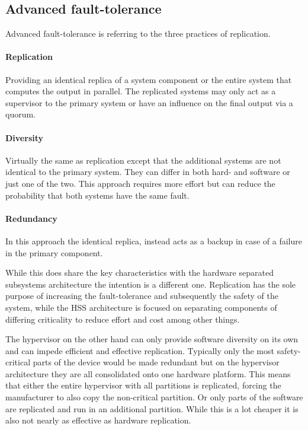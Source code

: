 \subsection{Advanced fault-tolerance} \label{advanced-fault-tolerance}
Advanced fault-tolerance is referring to the three practices of replication.
\paragraph{Replication} Providing an identical replica of a system component or the entire system that computes the output in parallel. The replicated systems may only act as a supervisor to the primary system or have an influence on the final output via a quorum.
\paragraph{Diversity} Virtually the same as replication except that the additional systems are not identical to the primary system. They can differ in both hard- and software or just one of the two. This approach requires more effort but can reduce the probability that both systems have the same fault. 
\paragraph{Redundancy} In this approach the identical replica, instead acts as a backup in case of a failure in the primary component.

While this does share the key characteristics with the hardware separated subsystems architecture the intention is a different one. 
Replication has the sole purpose of increasing the fault-tolerance and subsequently the safety of the system, while the \gls{HSS} architecture is focused on separating components of differing criticality to reduce effort and cost among other things.

The hypervisor on the other hand can only provide software diversity on its own and can impede efficient and effective replication. Typically only the most safety-critical parts of the device would be made redundant but on the hypervisor architecture they are all consolidated onto one hardware platform. This means that either the entire hypervisor with all partitions is replicated, forcing the manufacturer to also copy the non-critical partition. Or only parts of the software are replicated and run in an additional partition. While this is a lot cheaper it is also not nearly as effective as hardware replication.
